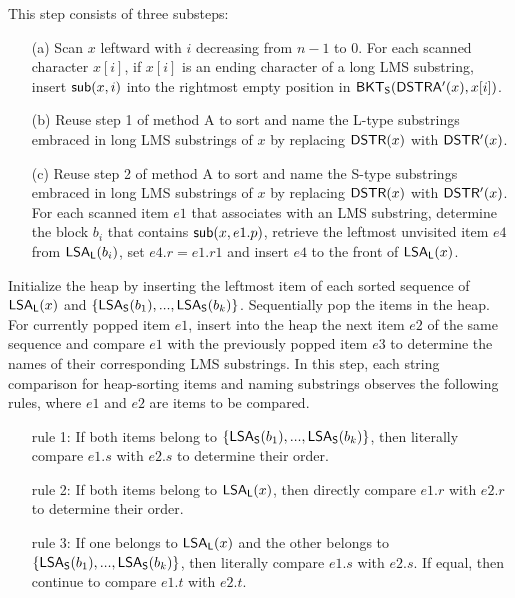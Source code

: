 \documentclass[10pt,journal,compsoc]{IEEEtran}
\begin{document}
\vspace{2ex} 

\noindent This step consists of three substeps:

\begin{itemize}[itemindent = 1ex]
	\item [(a)] Scan $x$ leftward with $i$ decreasing from $n - 1$ to $0$. For each scanned character $x[i]$, if $x[i]$ is an ending character of a long LMS substring, insert ${\sf sub}(x, i)$ into the rightmost empty position in ${\sf BKT_S}({\sf DSTRA'}(x), x[i])$.
	
	\item [(b)] Reuse step 1 of method A to sort and name the L-type substrings embraced in long LMS substrings of $x$ by replacing ${\sf DSTR}(x)$ with ${\sf DSTR'}(x)$.
	
	\item [(c)] Reuse step 2 of method A to sort and name the S-type substrings embraced in long LMS substrings of $x$ by replacing ${\sf DSTR}(x)$ with ${\sf DSTR'}(x)$. For each scanned item $e1$ that associates with an LMS substring, determine the block $b_i$ that contains ${\sf sub}(x, e1.p)$, retrieve the leftmost unvisited item $e4$ from ${\sf LSA_L}(b_i)$, set $e4.r = e1.r1$ and insert $e4$ to the front of ${\sf LSA_L}(x)$.
	
\end{itemize}

\vspace{2ex} 

\noindent Initialize the heap by inserting the leftmost item of each sorted sequence of ${\sf LSA_L}(x)$ and $\{{\sf LSA_S}(b_1),...,{\sf LSA_S}(b_k)\}$. Sequentially pop the items in the heap. For currently popped item $e1$, insert into the heap the next item $e2$ of the same sequence and compare $e1$ with the previously popped item $e3$ to determine the names of their corresponding LMS substrings. In this step, each string comparison for heap-sorting items and naming substrings observes the following rules, where $e1$ and $e2$ are items to be compared.

\begin{itemize}[itemindent = 5ex]
	
	\item [rule 1:] If both items belong to $\{{\sf LSA_S}(b_1),...,{\sf LSA_S}(b_k)\}$, then literally compare $e1.s$ with $e2.s$ to determine their order.
	
	\item [rule 2:] If both items belong to ${\sf LSA_L}(x)$, then directly compare $e1.r$ with $e2.r$ to determine their order.
	
	\item [rule 3:] If one belongs to ${\sf LSA_L}(x)$ and the other belongs to $\{{\sf LSA_S}(b_1),...,{\sf LSA_S}(b_k)\}$, then literally compare $e1.s$ with $e2.s$. If equal, then continue to compare $e1.t$ with $e2.t$.
	
\end{itemize}
\end{document}
